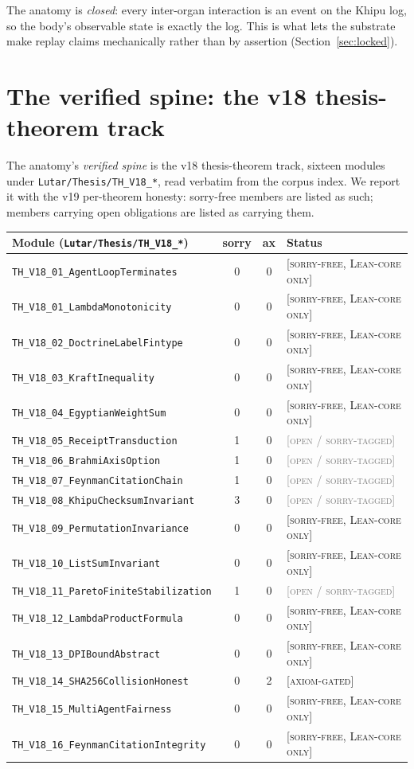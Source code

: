 \documentclass[11pt]{article}
\theoremstyle{plain}
\theoremstyle{definition}
\theoremstyle{remark}
\newcommand{\statusSorryFree}{\textcolor{szlteal}{\textsc{[sorry-free, Lean-core only]}}}
\newcommand{\statusAxiom}{\textcolor{orange!80!black}{\textsc{[axiom-gated]}}}
\newcommand{\statusOpen}{\textcolor{gray}{\textsc{[open / sorry-tagged]}}}
\begin{document}
The anatomy is \emph{closed}: every inter-organ interaction is an event on the Khipu
log, so the body's observable state is exactly the log. This is what lets the substrate
make replay claims mechanically rather than by assertion (Section~\ref{sec:locked}).

\section{The verified spine: the v18 thesis-theorem track}
\label{sec:spine}

The anatomy's \emph{verified spine} is the v18 thesis-theorem track, sixteen modules
under \texttt{Lutar/Thesis/TH\_V18\_*}, read verbatim from the corpus index. We report
it with the v19 per-theorem honesty: sorry-free members are listed as such; members
carrying open obligations are listed as carrying them.

\begin{center}
\begin{longtable}{@{}lccl@{}}
\toprule
\textbf{Module (\texttt{Lutar/Thesis/TH\_V18\_*})} & \textbf{sorry} & \textbf{ax} & \textbf{Status}\\
\midrule
\endhead
\texttt{TH\_V18\_01\_AgentLoopTerminates} & 0 & 0 & \statusSorryFree\\
\texttt{TH\_V18\_01\_LambdaMonotonicity} & 0 & 0 & \statusSorryFree\\
\texttt{TH\_V18\_02\_DoctrineLabelFintype} & 0 & 0 & \statusSorryFree\\
\texttt{TH\_V18\_03\_KraftInequality} & 0 & 0 & \statusSorryFree\\
\texttt{TH\_V18\_04\_EgyptianWeightSum} & 0 & 0 & \statusSorryFree\\
\texttt{TH\_V18\_05\_ReceiptTransduction} & 1 & 0 & \statusOpen\\
\texttt{TH\_V18\_06\_BrahmiAxisOption} & 1 & 0 & \statusOpen\\
\texttt{TH\_V18\_07\_FeynmanCitationChain} & 1 & 0 & \statusOpen\\
\texttt{TH\_V18\_08\_KhipuChecksumInvariant} & 3 & 0 & \statusOpen\\
\texttt{TH\_V18\_09\_PermutationInvariance} & 0 & 0 & \statusSorryFree\\
\texttt{TH\_V18\_10\_ListSumInvariant} & 0 & 0 & \statusSorryFree\\
\texttt{TH\_V18\_11\_ParetoFiniteStabilization} & 1 & 0 & \statusOpen\\
\texttt{TH\_V18\_12\_LambdaProductFormula} & 0 & 0 & \statusSorryFree\\
\texttt{TH\_V18\_13\_DPIBoundAbstract} & 0 & 0 & \statusSorryFree\\
\texttt{TH\_V18\_14\_SHA256CollisionHonest} & 0 & 2 & \statusAxiom\\
\texttt{TH\_V18\_15\_MultiAgentFairness} & 0 & 0 & \statusSorryFree\\
\texttt{TH\_V18\_16\_FeynmanCitationIntegrity} & 0 & 0 & \statusSorryFree\\
\bottomrule
\end{longtable}
\end{center}
\end{document}
